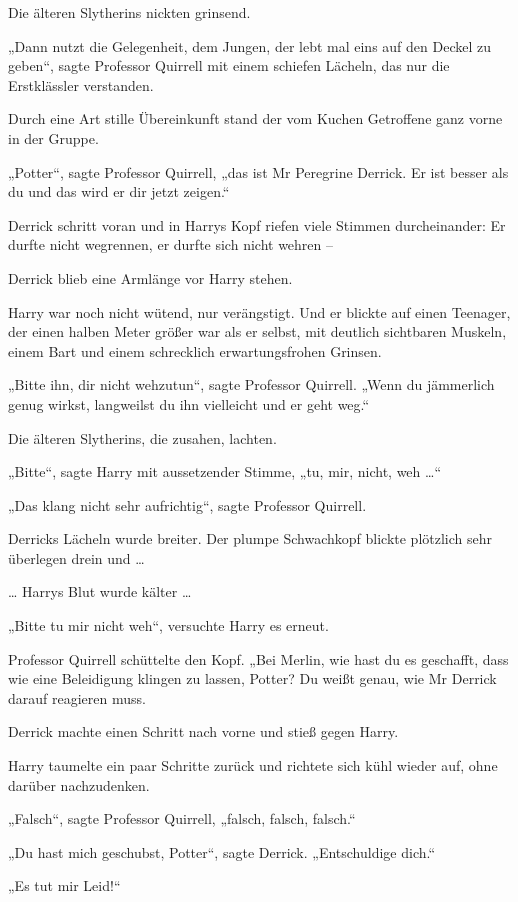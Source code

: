 {Die älteren Slytherins nickten grinsend.

„Dann nutzt die Gelegenheit, dem Jungen, der lebt mal eins auf den Deckel zu geben“, sagte Professor Quirrell mit einem schiefen Lächeln, das nur die Erstklässler verstanden.

Durch eine Art stille Übereinkunft stand der vom Kuchen Getroffene ganz vorne in der Gruppe.

„Potter“, sagte Professor Quirrell, „das ist Mr Peregrine Derrick. Er ist besser als du und das wird er dir jetzt zeigen.“

Derrick schritt voran und in Harrys Kopf riefen viele Stimmen durcheinander: Er durfte nicht wegrennen, er durfte sich nicht wehren --

Derrick blieb eine Armlänge vor Harry stehen.

Harry war noch nicht wütend, nur verängstigt. Und er blickte auf einen Teenager, der einen halben Meter größer war als er selbst, mit deutlich sichtbaren Muskeln, einem Bart und einem schrecklich erwartungsfrohen Grinsen.

„Bitte ihn, dir nicht wehzutun“, sagte Professor Quirrell. „Wenn du jämmerlich genug wirkst, langweilst du ihn vielleicht und er geht weg.“

Die älteren Slytherins, die zusahen, lachten.

„Bitte“, sagte Harry mit aussetzender Stimme, „tu, mir, nicht, weh …“

„Das klang nicht sehr aufrichtig“, sagte Professor Quirrell.

Derricks Lächeln wurde breiter. Der plumpe Schwachkopf blickte plötzlich sehr überlegen drein und …

… Harrys Blut wurde kälter …

„Bitte tu mir nicht weh“, versuchte Harry es erneut.

Professor Quirrell schüttelte den Kopf. „Bei Merlin, wie hast du es geschafft, dass wie eine Beleidigung klingen zu lassen, Potter? Du weißt genau, wie Mr Derrick darauf reagieren muss.

Derrick machte einen Schritt nach vorne und stieß gegen Harry.

Harry taumelte ein paar Schritte zurück und richtete sich kühl wieder auf, ohne darüber nachzudenken.

„Falsch“, sagte Professor Quirrell, „falsch, falsch, falsch.“

„Du hast mich geschubst, Potter“, sagte Derrick. „Entschuldige dich.“

„Es tut mir Leid!“

}
